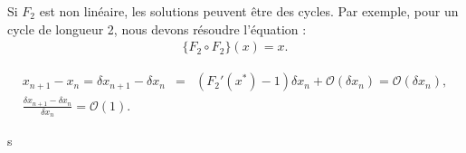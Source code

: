 \begin{enumerate}[label = Méthode \arabic*)]
	Si \(F_2\) est non linéaire, les solutions peuvent être des cycles. Par exemple, pour un cycle de longueur 2, nous devons résoudre l'équation :
	\begin{eqnarray}
		\{F_2 \circ F_2\}(x) = x.
	\end{eqnarray}
	
	\begin{eqnarray}
		x_{n+1} - x_{n} = \delta x_{n+1} - \delta x_{n} & = &  (F_2'(x^\ast) - 1 )\delta x_n + \mathcal{O}(\delta x_n) = \mathcal{O}(\delta x_n), \\
		\frac{\delta x_{n+1} - \delta x_{n}}{\delta x_{n}} = \mathcal{O}(1).
	\end{eqnarray}

	

\end{enumerate}




	
	
	
	





 


	

 






	



	
	

s